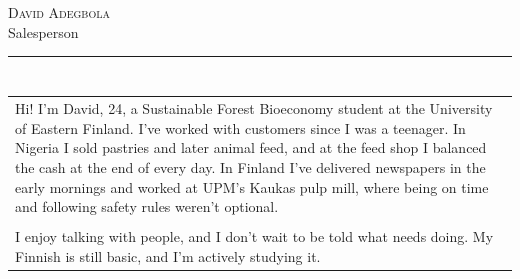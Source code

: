 \documentclass[a4paper,11pt]{article}
\begin{document}
\begin{cvheader}
\par{\centering
		{\Huge \textsc{David Adegbola}}\\[0.4em]
		{\Large Salesperson}
	\bigskip\par}

\hrule
\vspace{0.5em}
\end{cvheader}

\section{}
\begin{tabular}{p{}}
 Hi! I'm David, 24, a Sustainable Forest Bioeconomy student at the University of Eastern Finland. I've worked with customers since I was a teenager. In Nigeria I sold pastries and later animal feed, and at the feed shop I balanced the cash at the end of every day. In Finland I've delivered newspapers in the early mornings and worked at UPM's Kaukas pulp mill, where being on time and following safety rules weren't optional.\\\\

 I enjoy talking with people, and I don't wait to be told what needs doing. My Finnish is still basic, and I'm actively studying it.
\end{tabular}

\section{}
\end{document}
